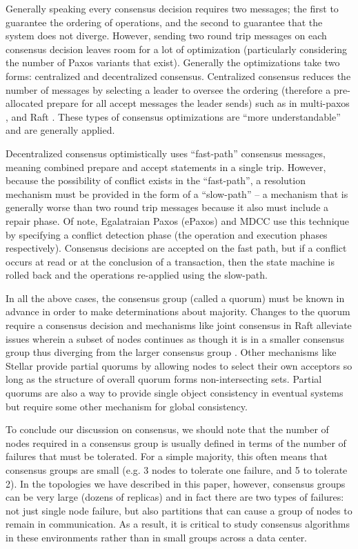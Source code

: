 \documentclass[letterpaper,twocolumn,10pt]{article}
\begin{document}
Generally speaking every consensus decision requires two messages; the first to guarantee the ordering of operations, and the second to guarantee that the system does not diverge. However, sending two round trip messages on each consensus decision leaves room for a lot of optimization (particularly considering the number of Paxos variants that exist). Generally the optimizations take two forms: centralized and decentralized consensus. Centralized consensus reduces the number of messages by selecting a leader to oversee the ordering (therefore a pre-allocated prepare for all accept messages the leader sends) such as in multi-paxos \cite{chandra_paxos_2007}, and Raft \cite{ongaro_search_2014,howard_raft_2015}. These types of consensus optimizations are ``more understandable'' and are generally applied.

Decentralized consensus optimistically uses ``fast-path'' consensus messages, meaning combined prepare and accept statements in a single trip. However, because the possibility of conflict exists in the ``fast-path'', a resolution mechanism must be provided in the form of a ``slow-path'' -- a mechanism that is generally worse than two round trip messages because it also must include a repair phase. Of note, Egalatraian Paxos (ePaxos) \cite{moraru_there_2013,moraru_egalitarian_2012} and MDCC \cite{kraska_mdcc_2013} use this technique by specifying a conflict detection phase (the operation and execution phases respectively). Consensus decisions are accepted on the fast path, but if a conflict occurs at read or at the conclusion of a transaction, then the state machine is rolled back and the operations re-applied using the slow-path.

In all the above cases, the consensus group (called a quorum) must be known in advance in order to make determinations about majority. Changes to the quorum require a consensus decision and mechanisms like joint consensus in Raft alleviate issues wherein a subset of nodes continues as though it is in a smaller consensus group thus diverging from the larger consensus group \cite{ongaro_search_2014}. Other mechanisms like Stellar \cite{mazieres_stellar_2015} provide partial quorums by allowing nodes to select their own acceptors so long as the structure of overall quorum forms non-intersecting sets. Partial quorums are also a way to provide single object consistency in eventual systems \cite{bailis_quantifying_2014, decandia_dynamo_2007} but require some other mechanism for global consistency.

To conclude our discussion on consensus, we should note that the number of nodes required in a consensus group is usually defined in terms of the number of failures that must be tolerated. For a simple majority, this often means that consensus groups are small (e.g. 3 nodes to tolerate one failure, and 5 to tolerate 2). In the topologies we have described in this paper, however, consensus groups can be very large (dozens of replicas) and in fact there are two types of failures: not just single node failure, but also partitions that can cause a group of nodes to remain in communication. As a result, it is critical to study consensus algorithms in these environments rather than in small groups across a data center.
\end{document}

